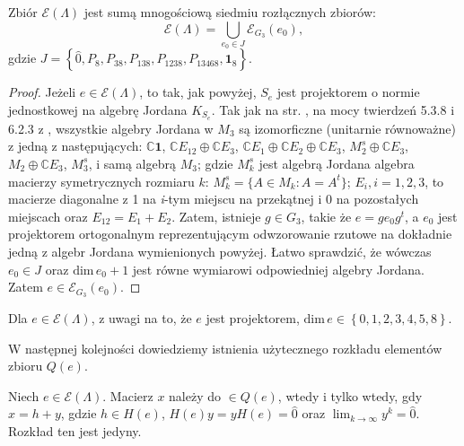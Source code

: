 {\begin{Theorem}
\label{thm:Idempotents}
Zbiór $\mathcal{E}(\Lambda)$
jest sumą mnogościową siedmiu rozłącznych zbiorów:
    \begin{equation}
        \mathcal{E}(\Lambda) = \bigcup \limits_{e_{0} \in J} \mathcal{E}_{G_{3}}(e_{0}),
    \end{equation}
    gdzie $J = \left \{ \hat{0}, P_{8}, P_{38}, P_{138}, P_{1238}, P_{13468}, \mathbf{1}_{8} \right \}$.
\end{Theorem}
\begin{proof}
Jeżeli $e \in \mathcal{E}(\Lambda)$, to tak, jak powyżej, $S_{e}$
jest projektorem o normie jednostkowej na algebrę Jordana $K_{S_{e}}$.
Tak jak na str. \pageref{page:allpossibleJalg},
na mocy twierdzeń 5.3.8 i 6.2.3 z \cite{Hanche1984},
wszystkie algebry Jordana w $M_{3}$ są izomorficzne (unitarnie równoważne) z
jedną z następujących:
    $\mathbb{C}\mathbf{1}$,
    $\mathbb{C} E_{12} \oplus \mathbb{C} E_{3}$,
    $\mathbb{C} E_{1} \oplus \mathbb{C} E_{2} \oplus \mathbb{C} E_{3}$,
    $M_{2}^{s} \oplus \mathbb{C} E_{3}$,
    $M_{2} \oplus \mathbb{C} E_{3}$,
    $M_{3}^{s}$,
    i
    samą algebrą $M_{3}$;
gdzie $M_{k}^{s}$ jest algebrą Jordana algebra macierzy symetrycznych rozmiaru
$k$: $M_{k}^{s} = \{ A \in M_{k}: A = A^{t} \}$;
    $E_{i}, i = 1,2,3$, to macierze diagonalne z 1 na \emph{i}-tym miejscu na
    przekątnej i 0 na pozostałych miejscach oraz $E_{12} = E_{1} + E_{2}$.
Zatem, istnieje $g \in G_{3}$, takie że
    $e = g e_{0} g ^{t}$, a $e_{0}$ jest projektorem ortogonalnym
    reprezentującym odwzorowanie rzutowe na dokładnie jedną z algebr Jordana
    wymienionych powyżej.
Łatwo sprawdzić, że wówczas $e_{0} \in J$ oraz
$\text{dim} \, e_{0} + 1$ jest równe wymiarowi odpowiedniej algebry Jordana.
Zatem $e \in \mathcal{E}_{G_{3}}(e_{0})$.
\end{proof}

\begin{Corollary}
\label{cor:q}
    Dla $e \in \mathcal{E}(\Lambda)$, z uwagi na to, że $e$ jest projektorem,
    $\text{dim} \, e
    \in \left \{ 0,1,2,3,4,5,8 \right \}$.
\end{Corollary}

W następnej kolejności dowiedziemy istnienia użytecznego rozkładu elementów
zbioru $Q(e)$.

\begin{Lemma}
\label{lem:decomposition}
    Niech $e \in \mathcal{E}(\Lambda)$.
    Macierz $x$ należy do $\in Q(e)$, wtedy i tylko wtedy, gdy
    $x = h + y$, gdzie
    $h \in H(e)$, $H(e) y = y H(e) = \hat{0}$ oraz
    $\lim_{k \rightarrow \infty} y^{k} = \hat{0}$.
    Rozkład ten jest jedyny.
\end{Lemma}

}

